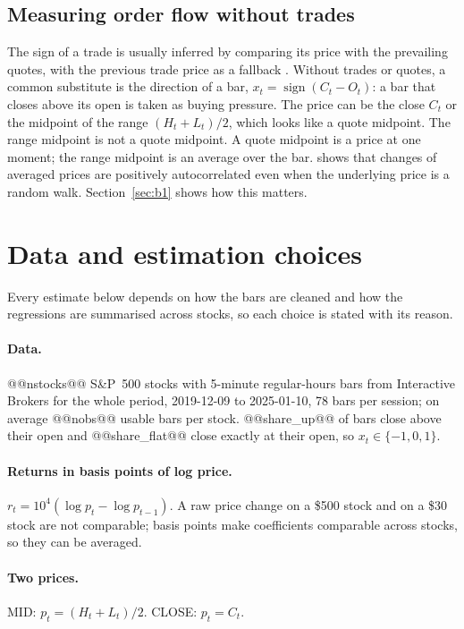 \documentclass[11pt,a4paper]{article}
\begin{document}
\subsection{Measuring order flow without trades}

The sign of a trade is usually inferred by comparing its price with the prevailing quotes, with the
previous trade price as a fallback \citep{lee1991}. Without trades or quotes, a common substitute is the
direction of a bar, $x_t = \operatorname{sign}(C_t-O_t)$: a bar that closes above its open is taken as
buying pressure. The price can be the close $C_t$ or the midpoint of the range $(H_t+L_t)/2$, which looks like a quote midpoint. The range midpoint is not a quote midpoint. A quote midpoint is a price at one moment; the range midpoint is an
average over the bar. \citet{working1960} shows that changes of averaged prices are positively
autocorrelated even when the underlying price is a random walk. Section~\ref{sec:b1} shows how this
matters.

\section{Data and estimation choices}
\label{sec:data}

Every estimate below depends on how the bars are cleaned and how the regressions are summarised across stocks, so each choice is stated with its reason.


\paragraph{Data.} @@nstocks@@ S\&P~500 stocks with 5-minute regular-hours bars from Interactive Brokers for
the whole period, 2019-12-09 to 2025-01-10, 78 bars per session; on average @@nobs@@ usable bars per
stock. @@share_up@@ of bars close above their open and @@share_flat@@ close exactly at their open, so
$x_t\in\{-1,0,1\}$.

\paragraph{Returns in basis points of log price.} $r_t = 10^4(\log p_t-\log p_{t-1})$. A raw price
change on a \$500 stock and on a \$30 stock are not comparable; basis points make coefficients
comparable across stocks, so they can be averaged.

\paragraph{Two prices.} MID: $p_t=(H_t+L_t)/2$. CLOSE: $p_t=C_t$.
\end{document}
